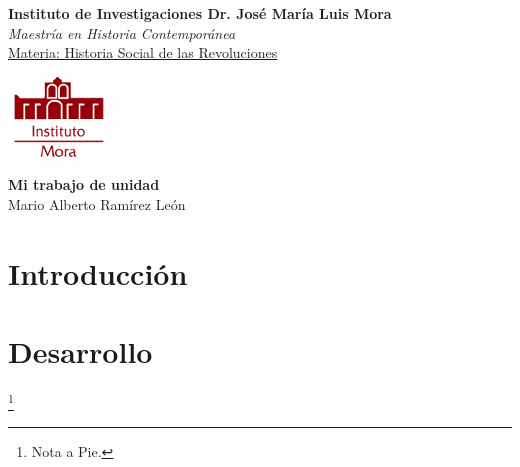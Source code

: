 \documentclass[12pt,letterpaper,oneside]{article}
\begin{document}
\thispagestyle{plain} %
\begin{flushleft}
	{\bfseries Instituto de Investigaciones Dr. José María Luis Mora} \\ 
	{\itshape Maestría en Historia Contemporánea}\\ \underline{Materia: Historia Social de las Revoluciones}\end{flushleft} %

\begin{flushright}\vspace{-15mm} %
	\includegraphics[scale=1]{escudo} %
\end{flushright}

\begin{center}\vspace{1cm}
	\textbf{\LARGE Mi trabajo de unidad}\\
	\vspace{1em}   %
	Mario Alberto Ramírez León\\                         %
\end{center}

\begin{abstract}
  \noindent \lipsum[1]
\end{abstract}

\onehalfspace %

\section*{Introducción}

\noindent \lipsum[1-3]

\section*{Desarrollo}

\noindent \lipsum[1-2]\footnote{Nota a Pie. \lipsum[1]}
\end{document}
